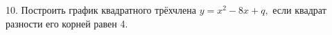 10. Построить график квадратного трёхчлена $y=x^2-8x+q,$ если квадрат разности его корней равен 4.\\
